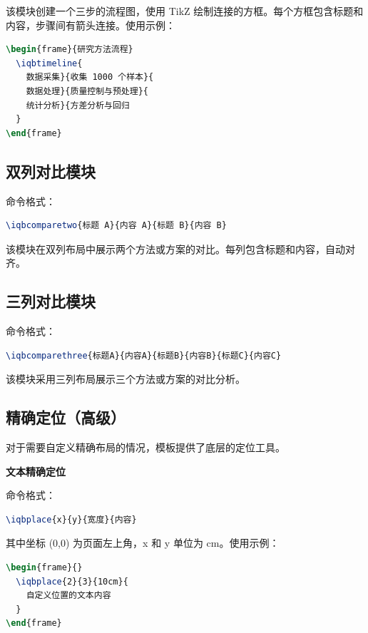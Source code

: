 该模块创建一个三步的流程图，使用 TikZ 绘制连接的方框。每个方框包含标题和内容，步骤间有箭头连接。使用示例：

\begin{lstlisting}[style=blockstyle,language=TeX]
\begin{frame}{研究方法流程}
  \iqbtimeline{
    数据采集}{收集 1000 个样本}{
    数据处理}{质量控制与预处理}{
    统计分析}{方差分析与回归
  }
\end{frame}
\end{lstlisting}

\subsection{双列对比模块}

命令格式：

\begin{lstlisting}[style=blockstyle,language=TeX]
\iqbcomparetwo{标题 A}{内容 A}{标题 B}{内容 B}
\end{lstlisting}

该模块在双列布局中展示两个方法或方案的对比。每列包含标题和内容，自动对齐。

\subsection{三列对比模块}

命令格式：

\begin{lstlisting}[style=blockstyle,language=TeX]
\iqbcomparethree{标题A}{内容A}{标题B}{内容B}{标题C}{内容C}
\end{lstlisting}

该模块采用三列布局展示三个方法或方案的对比分析。

\subsection{精确定位（高级）}

对于需要自定义精确布局的情况，模板提供了底层的定位工具。

\textbf{文本精确定位}

命令格式：

\begin{lstlisting}[style=blockstyle,language=TeX]
\iqbplace{x}{y}{宽度}{内容}
\end{lstlisting}

其中坐标 (0,0) 为页面左上角，x 和 y 单位为 cm。使用示例：

\begin{lstlisting}[style=blockstyle,language=TeX]
\begin{frame}{}
  \iqbplace{2}{3}{10cm}{
    自定义位置的文本内容
  }
\end{frame}
\end{lstlisting}

